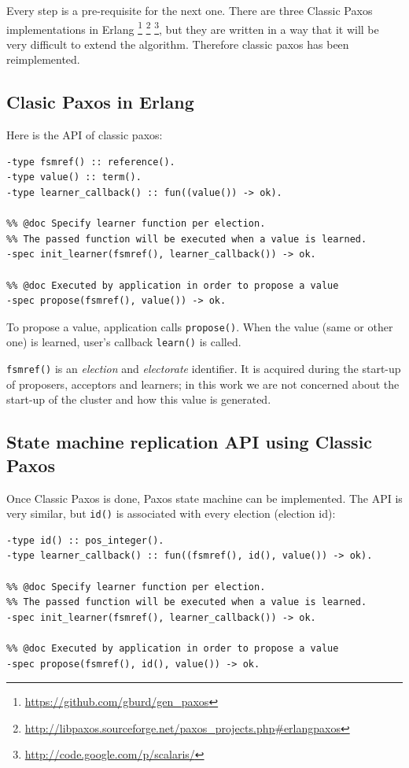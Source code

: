 \documentclass[english,11pt]{l4proj}
\begin{document}
Every step is a pre-requisite for the next one. There are three Classic Paxos
implementations in Erlang \footnote{\url{https://github.com/gburd/gen\_paxos}}
\footnote{\url{http://libpaxos.sourceforge.net/paxos\_projects.php\#erlangpaxos}}
\footnote{\url{http://code.google.com/p/scalaris/}}, but they are written in a
way that it will be very difficult to extend the algorithm. Therefore classic
paxos has been reimplemented.

\subsection{Clasic Paxos in Erlang}

Here is the API of classic paxos:

\begin{verbatim}
-type fsmref() :: reference().
-type value() :: term().
-type learner_callback() :: fun((value()) -> ok).

%% @doc Specify learner function per election.
%% The passed function will be executed when a value is learned.
-spec init_learner(fsmref(), learner_callback()) -> ok.

%% @doc Executed by application in order to propose a value
-spec propose(fsmref(), value()) -> ok.
\end{verbatim}

To propose a value, application calls {\tt propose()}. When the value (same or
other one) is learned, user's callback {\tt learn()} is called.

{\tt fsmref()} is an \emph{election} and \emph{electorate} identifier. It is
acquired during the start-up of proposers, acceptors and learners; in this work
we are not concerned about the start-up of the cluster and how this value is
generated.

\subsection{State machine replication API using Classic Paxos}

Once Classic Paxos is done, Paxos state machine can be implemented. The API is
very similar, but {\tt id()} is associated with every election (election id):

\begin{verbatim}
-type id() :: pos_integer().
-type learner_callback() :: fun((fsmref(), id(), value()) -> ok).

%% @doc Specify learner function per election.
%% The passed function will be executed when a value is learned.
-spec init_learner(fsmref(), learner_callback()) -> ok.

%% @doc Executed by application in order to propose a value
-spec propose(fsmref(), id(), value()) -> ok.
\end{verbatim}
\end{document}
